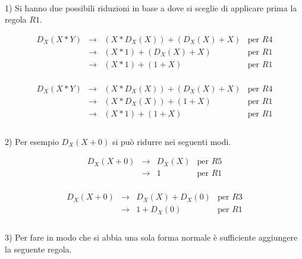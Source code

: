 \documentclass{article}
\begin{document}
\paragraph{}

1) Si hanno due possibili riduzioni in base a dove si sceglie di applicare prima la regola $R1$.

\[\begin{array}{llll}
D_X(X * Y) & \to & (X * D_X(X)) + (D_X(X) + X) & \mbox{per $R4$} \\
                 & \to & (X * 1) + (D_X(X) + X) & \mbox{per $R1$} \\
                 & \to & (X * 1) + (1 + X) & \mbox{per $R1$} \\
\end{array}\]

\[\begin{array}{llll}
D_X(X * Y) & \to & (X * D_X(X)) + (D_X(X) + X) & \mbox{per $R4$} \\
                 & \to & (X * D_X(X)) + (1 + X) & \mbox{per $R1$} \\
                 & \to & (X * 1) + (1 + X) & \mbox{per $R1$} \\
\end{array}\]

\paragraph{}

2) Per esempio $D_X(X + 0)$ si può ridurre nei seguenti modi.

\[\begin{array}{llll}
D_X(X + 0) & \to & D_X(X) & \mbox{per $R5$} \\
           & \to & 1 & \mbox{per $R1$} \\
\end{array}\]

\[\begin{array}{llll}
D_X(X + 0) & \to & D_X(X) + D_X(0) & \mbox{per $R3$} \\
           & \to & 1 + D_X(0)& \mbox{per $R1$} \\
\end{array}\]

\paragraph{}

3) Per fare in modo che si abbia una sola forma normale è sufficiente aggiungere la seguente regola.
\end{document}
